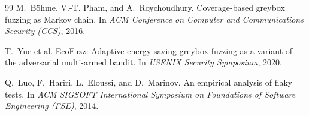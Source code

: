 \documentclass[11pt]{article}
\begin{document}
\begin{thebibliography}{99}
 M.~B{\"o}hme, V.-T. Pham, and A.~Roychoudhury. Coverage-based greybox fuzzing as Markov chain. In \emph{ACM Conference on Computer and Communications Security (CCS)}, 2016.

 T.~Yue et al. EcoFuzz: Adaptive energy-saving greybox fuzzing as a variant of the adversarial multi-armed bandit. In \emph{USENIX Security Symposium}, 2020.

 Q.~Luo, F.~Hariri, L.~Eloussi, and D.~Marinov. An empirical analysis of flaky tests. In \emph{ACM SIGSOFT International Symposium on Foundations of Software Engineering (FSE)}, 2014.

\end{thebibliography}
\end{document}
